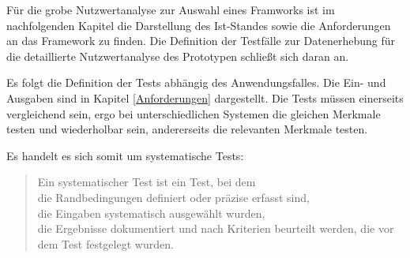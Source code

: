 Für die grobe Nutzwertanalyse zur Auswahl eines Framworks ist im nachfolgenden Kapitel die Darstellung des Ist-Standes sowie die Anforderungen an das Framework zu finden.
Die Definition der Testfälle zur Datenerhebung für die detaillierte Nutzwertanalyse des Prototypen schließt sich daran an.

Es folgt die Definition der Tests abhängig des Anwendungsfalles.
Die Ein- und Ausgaben sind  in Kapitel \ref{Anforderungen} dargestellt.
Die Tests müssen einerseits vergleichend sein, ergo bei unterschiedlichen Systemen die gleichen Merkmale testen und wiederholbar sein, andererseits die relevanten Merkmale testen.

Es handelt es sich somit um systematische Tests:
\begin {quote}
Ein systematischer Test ist ein Test, bei dem\\
die Randbedingungen definiert oder präzise erfasst sind,\\
die Eingaben systematisch ausgewählt wurden,\\
die Ergebnisse dokumentiert und nach Kriterien beurteilt werden, die vor dem Test festgelegt wurden.\cite[S.446]{book:softwareengineering}
\end{quote}

